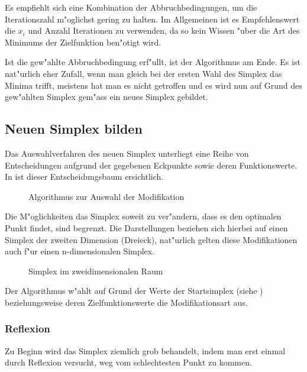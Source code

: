 Es empfiehlt sich eine Kombination der Abbruchbedingungen, um die Iterationszahl m"oglichst gering zu halten.
Im Allgemeinen ist es Empfehlenswert die $x_i$ und Anzahl Iterationen zu verwenden, da so kein Wissen "uber die Art des Minimums der Zielfunktion ben"otigt wird.

Ist die gew"ahlte Abbruchbedingung erf"ullt, ist der Algorithmus am Ende.
Es ist nat"urlich eher Zufall, wenn man gleich bei der ersten Wahl des Simplex das Minima trifft, meistens hat man es nicht getroffen und es wird nun auf Grund des gew"ahlten Simplex gem"ass  ein neues Simplex gebildet.

\subsection{Neuen Simplex bilden}
\label{sec:downhillModi}

Das Auswahlverfahren des neuen Simplex unterliegt eine Reihe von Entscheidungen aufgrund der gegebenen Eckpunkte sowie deren Funktionswerte.
In  ist dieser Entscheidungsbaum ersichtlich.

\begin{figure}[h]

\caption{Algorithmus zur Auswahl der Modifikation}
\label{fig:downhillalg2}
\end{figure}

Die M"oglichkeiten das Simplex soweit zu ver"andern, dass es den optimalen Punkt findet, sind begrenzt.
Die Darstellungen beziehen sich hierbei auf einen Simplex der zweiten Dimension (Dreieck), nat"urlich gelten diese Modifikationen auch f"ur einen n-dimensionalen Simplex.

\begin{figure}[h]
	\centering
  	\caption{Simplex im zweidimensionalen Raum}%
	\label{fig:downhillStart}
\end{figure}

Der Algorithmus w"ahlt auf Grund der Werte der Startsimplex (siehe ) beziehungsweise deren Zielfunktionswerte die Modifikationsart aus.

\subsubsection{Reflexion}

Zu Beginn wird das Simplex ziemlich grob behandelt, indem man erst einmal durch Reflexion versucht, weg vom schlechtesten Punkt zu kommen.

